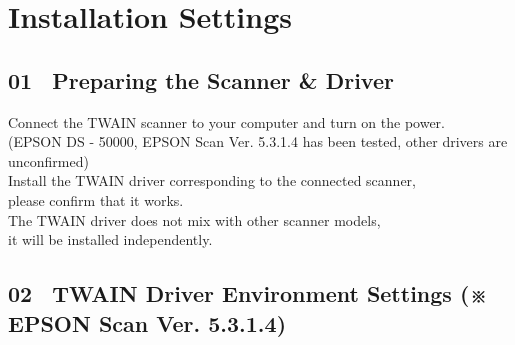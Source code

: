 \documentclass[a4paper,10pt]{article}
\renewcommand{\baselinestretch}{1.24}
\begin{document}
\fancyfoot[R]{\vskip 0.1em \textbf{\thepage}}

\newpage

\renewcommand{\baselinestretch}{1.40}

\normalsize

\section*{Installation Settings}

\subsection*{01 \ Preparing the Scanner \& Driver}

\noindent Connect the TWAIN scanner to your computer and turn on the power.\\
(EPSON DS - 50000, EPSON Scan Ver. 5.3.1.4 has been tested, other drivers are unconfirmed)\\
Install the TWAIN driver corresponding to the connected scanner,\\
please confirm that it works.\\
The TWAIN driver does not mix with other scanner models,\\
it will be installed independently.\\

\subsection*{02 \ TWAIN Driver Environment Settings (※ EPSON Scan Ver. 5.3.1.4)}
\end{document}
